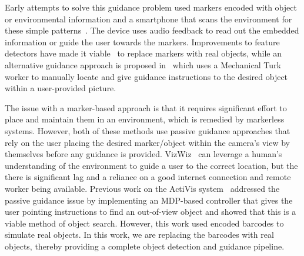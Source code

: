 \documentclass[runningheads]{llncs}
\begin{document}
Early attempts to solve this guidance problem used markers encoded with object or environmental information and a smartphone that scans the environment for these simple patterns~\cite{gude2013blind,manduchi2012mobile}. 
The device uses audio feedback to read out the embedded information or guide the user towards the markers. 
Improvements to feature detectors have made it viable~\cite{redmon2016you} to replace markers with real objects, while an alternative guidance approach is proposed in~\cite{bigham2010vizwiz} which uses a Mechanical Turk worker to manually locate and give guidance instructions to the desired object within a user-provided picture. 

The issue with a marker-based approach is that it requires significant effort to place and maintain them in an environment, which is remedied by markerless systems.
However, both of these methods use passive guidance approaches that rely on the user placing the desired marker/object within the camera's view by themselves before any guidance is provided. 
VizWiz~\cite{bigham2010vizwiz} can leverage a human's understanding of the environment to guide a user to the correct location, but the there is significant lag and a reliance on a good internet connection and remote worker being available. 
Previous work on the ActiVis system~\cite{lock2019active} addressed the passive guidance issue by implementing an MDP-based controller that gives the user pointing instructions to find an out-of-view object and showed that this is a viable method of object search. 
However, this work used encoded barcodes to simulate real objects.
In this work, we are replacing the barcodes with real objects, thereby providing a complete object detection and guidance pipeline. 
\end{document}
